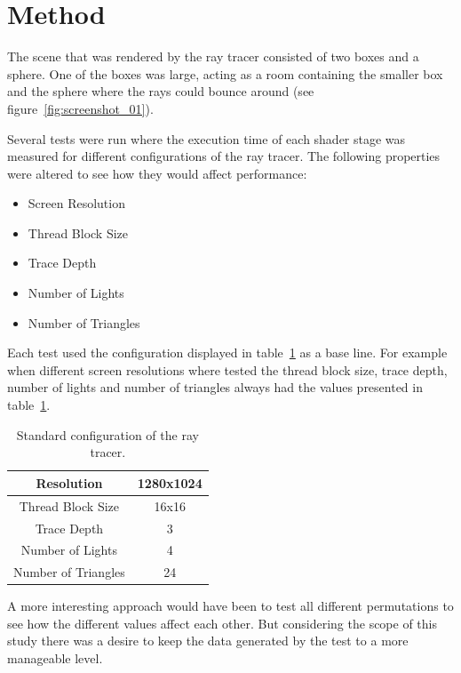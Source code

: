 \documentclass{article}
\begin{document}
\section{Method}
\label{sec:Method}
The scene that was rendered by the ray tracer consisted of two boxes and a sphere.
One of the boxes was large, acting as a room containing the smaller box and the sphere where the rays could bounce around
(see figure~\ref{fig:screenshot_01}).

Several tests were run where the execution time of each shader stage was measured for different configurations of the ray tracer. 
The following properties were altered to see how they would affect performance:

\begin{itemize}
    \centering
    \item Screen Resolution
    \item Thread Block Size
    \item Trace Depth
    \item Number of Lights
    \item Number of Triangles
\end{itemize}

Each test used the configuration displayed in table~\ref{tab:standardConfig} as a base line. For example when different screen resolutions
where tested the thread block size, trace depth, number of lights and number of triangles always had the values presented in table~\ref{tab:standardConfig}.

\begin{table}
    \centering
    \def\arraystretch{1.5}
    \begin{tabular}{c|c}
        Resolution       & 1280x1024 \\
        \hline
        Thread Block Size & 16x16 \\
        \hline
        Trace Depth      & 3 \\
        \hline
        Number of Lights & 4 \\
        \hline
        Number of Triangles & 24 \\
        \hline
    \end{tabular}
    \caption{Standard configuration of the ray tracer. \label{tab:standardConfig}}
\end{table}

A more interesting approach would have been to test all different permutations to see how the different values affect each other.
But considering the scope of this study there was a desire to keep the data generated by the test to a more manageable level.
\end{document}
